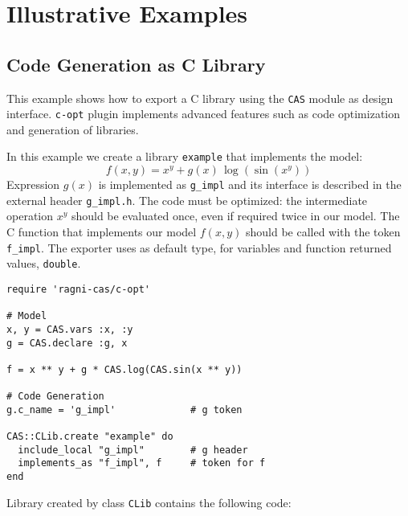 
\section{Illustrative Examples}
\label{sec:examples}

\subsection{Code Generation as C Library}
This example shows how to export a C library using the \texttt{CAS} module as design interface. \texttt{c-opt} plugin implements advanced features such as code optimization and generation of libraries.

In this example we create a library \texttt{example} that implements the model:
\begin{equation}
f(x, y) = x^y + g(x)\, \log(\sin(x^y))
\end{equation}
Expression $g(x)$ is implemented as \texttt{g\_impl} and its interface is described in the external header \texttt{g\_impl.h}. The code must be optimized: the intermediate operation $x^y$ should be evaluated once, even if required twice in our model. The C function that implements our model $f(x,y)$ should be called with the token \texttt{f\_impl}. The exporter uses as default type, for variables and function returned values, \texttt{double}.

\begin{lstlisting}[caption={Calling optimized-C exporter for library generation},label={code:example-exporting-C-1}]
require 'ragni-cas/c-opt'

# Model
x, y = CAS.vars :x, :y
g = CAS.declare :g, x

f = x ** y + g * CAS.log(CAS.sin(x ** y))

# Code Generation
g.c_name = 'g_impl'             # g token

CAS::CLib.create "example" do
  include_local "g_impl"        # g header
  implements_as "f_impl", f     # token for f
end
\end{lstlisting}
Library created by class \texttt{CLib} contains the following code:

\noindent%
  \begin{minipage}{.5\textwidth}
    
  \end{minipage}\hfill
  \begin{minipage}{.5\textwidth}
    
  \end{minipage}

